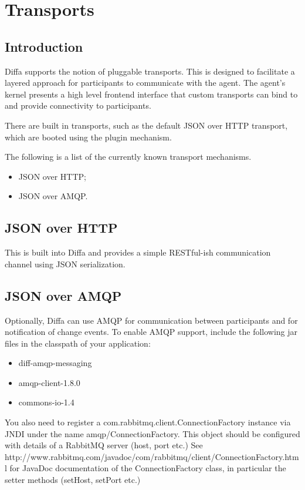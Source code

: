 \chapter{Transports}

\section{Introduction}

Diffa supports the notion of pluggable transports. This is designed to facilitate a layered approach for participants to communicate with the agent. The agent's kernel presents a high level frontend interface that custom transports can bind to and provide connectivity to participants.

There are built in transports, such as the default JSON over HTTP transport, which are booted using the plugin mechanism.

The following is a list of the currently known transport mechanisms.

\begin{itemize}
	\item JSON over HTTP;
	\item JSON over AMQP.
\end{itemize}

\section{JSON over HTTP}

This is built into Diffa and provides a simple RESTful-ish communication channel using JSON serialization.

\section{JSON over AMQP}

Optionally, Diffa can use AMQP for communication between participants and for notification of change events.
To enable AMQP support, include the following jar files in the classpath of your application:

\begin{itemize}
    \item diff-amqp-messaging
    \item amqp-client-1.8.0
    \item commons-io-1.4
\end{itemize}

You also need to register a com.rabbitmq.client.ConnectionFactory instance via JNDI under the name amqp/ConnectionFactory.
This object should be configured with details of a RabbitMQ server (host, port etc.) See
http://www.rabbitmq.com/javadoc/com/rabbitmq/client/ConnectionFactory.html for JavaDoc documentation of the ConnectionFactory
class, in particular the setter methods (setHost, setPort etc.)


